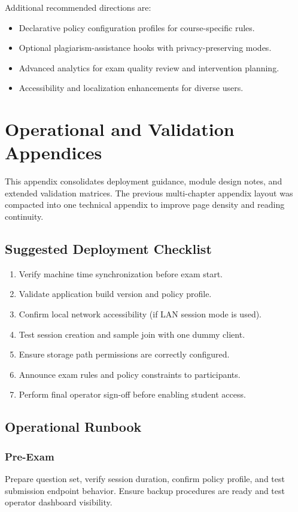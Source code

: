 \documentclass[12pt,a4paper]{report}
\begin{document}
	Additional recommended directions are:
	\begin{itemize}
		\item Declarative policy configuration profiles for course-specific rules.
		\item Optional plagiarism-assistance hooks with privacy-preserving modes.
		\item Advanced analytics for exam quality review and intervention planning.
		\item Accessibility and localization enhancements for diverse users.
	\end{itemize}
	
	\appendix
	\chapter{Operational and Validation Appendices}
	This appendix consolidates deployment guidance, module design notes, and extended validation matrices. The previous multi-chapter appendix layout was compacted into one technical appendix to improve page density and reading continuity.
	
	\section{Suggested Deployment Checklist}
	\begin{enumerate}
		\item Verify machine time synchronization before exam start.
		\item Validate application build version and policy profile.
		\item Confirm local network accessibility (if LAN session mode is used).
		\item Test session creation and sample join with one dummy client.
		\item Ensure storage path permissions are correctly configured.
		\item Announce exam rules and policy constraints to participants.
		\item Perform final operator sign-off before enabling student access.
	\end{enumerate}
	
	\section{Operational Runbook}
	\subsection{Pre-Exam}
	Prepare question set, verify session duration, confirm policy profile, and test submission endpoint behavior. Ensure backup procedures are ready and test operator dashboard visibility.
	
\end{document}
